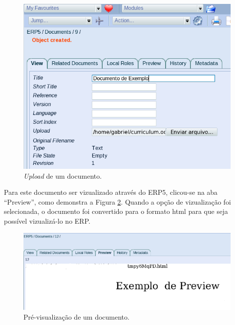 \begin{figure}[!ht]
\centering
\begin{center}
\includegraphics[scale=0.570,bb=0 30 510 340]{upload_text.png}
\end{center}
\caption{\textit{Upload} de um documento.}
\label{fig:upload_text}
\end{figure}

Para este documento ser vizualizado através do ERP5, clicou-se na aba ``Preview'', como demonstra a Figura \ref{fig:preview_erp5}. Quando a opção de vizualização foi selecionada, o documento foi convertido para o formato html para que seja possível vizualizá-lo no ERP.

\begin{figure}[!ht]
\centering
\begin{center}
\includegraphics[scale=0.570,bb=0 30 810 240]{preview_erp5.png}
\end{center}
\caption{Pré-visualização de um documento.}
\label{fig:preview_erp5}
\end{figure}

